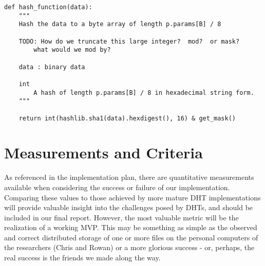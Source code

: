 \documentclass[12pt]{report}
\begin{document}
\begin{lstlisting}[label=hashing.py]
def hash_function(data):
    """
    Hash the data to a byte array of length p.params[B] / 8

    TODO: How do we truncate this large integer?  mod?  or mask?
        what would we mod by?

    data : binary data
    
    int 
        A hash of length p.params[B] / 8 in hexadecimal string form.
    """
        
    return int(hashlib.sha1(data).hexdigest(), 16) & get_mask() 
\end{lstlisting}

    \section{Measurements and Criteria}
    As referenced in the implementation plan, there are quantitative
    measurements available when considering the success or failure of our
    implementation.  Comparing these values to those achieved by more mature
    DHT implementations will provide valuable insight into the challenges posed
    by DHTs, and should be included in our final report.  However, the most
    valuable metric will be the realization of a working MVP.  This may be
    something as simple as the observed and correct distributed storage of one
    or more files on the personal computers of the researchers (Chris and
    Rowan) or a more glorious success - or, perhaps, the real success is the
    friends we made along the way.
\end{document}
